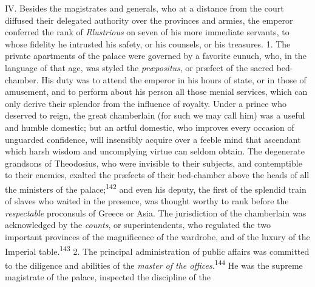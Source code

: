 

IV. Besides the magistrates and generals, who at a distance from
the court diffused their delegated authority over the provinces
and armies, the emperor conferred the rank of \textit{Illustrious} on
seven of his more immediate servants, to whose fidelity he
intrusted his safety, or his counsels, or his treasures. 1. The
private apartments of the palace were governed by a favorite
eunuch, who, in the language of that age, was styled the
\textit{præpositus}, or præfect of the sacred bed-chamber. His duty was
to attend the emperor in his hours of state, or in those of
amusement, and to perform about his person all those menial
services, which can only derive their splendor from the influence
of royalty. Under a prince who deserved to reign, the great
chamberlain (for such we may call him) was a useful and humble
domestic; but an artful domestic, who improves every occasion of
unguarded confidence, will insensibly acquire over a feeble mind
that ascendant which harsh wisdom and uncomplying virtue can
seldom obtain. The degenerate grandsons of Theodosius, who were
invisible to their subjects, and contemptible to their enemies,
exalted the præfects of their bed-chamber above the heads of all
the ministers of the palace;\textsuperscript{142} and even his deputy, the first
of the splendid train of slaves who waited in the presence, was
thought worthy to rank before the \textit{respectable} proconsuls of
Greece or Asia. The jurisdiction of the chamberlain was
acknowledged by the \textit{counts}, or superintendents, who regulated
the two important provinces of the magnificence of the wardrobe,
and of the luxury of the Imperial table.\textsuperscript{143} 2. The principal
administration of public affairs was committed to the diligence
and abilities of the \textit{master of the offices}.\textsuperscript{144} He was the
supreme magistrate of the palace, inspected the discipline of the
